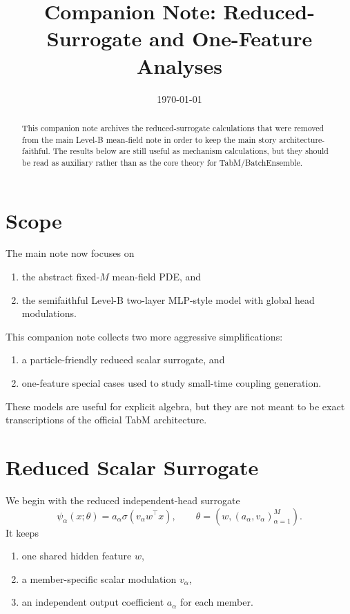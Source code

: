 \documentclass[11pt]{article}
\title{Companion Note: Reduced-Surrogate and One-Feature Analyses}
\author{}
\date{\today}
\theoremstyle{definition}
\begin{document}
\maketitle

\begin{abstract}
This companion note archives the reduced-surrogate calculations that were removed from the main Level-B mean-field note in order to keep the main story architecture-faithful.
The results below are still useful as mechanism calculations, but they should be read as auxiliary rather than as the core theory for TabM/BatchEnsemble.
\end{abstract}

\section{Scope}

The main note now focuses on
\begin{enumerate}[leftmargin=2em]
  \item the abstract fixed-$M$ mean-field PDE, and
  \item the semifaithful Level-B two-layer MLP-style model with global head modulations.
\end{enumerate}
This companion note collects two more aggressive simplifications:
\begin{enumerate}[leftmargin=2em]
  \item a particle-friendly reduced scalar surrogate, and
  \item one-feature special cases used to study small-time coupling generation.
\end{enumerate}
These models are useful for explicit algebra, but they are not meant to be exact transcriptions of the official TabM architecture.

\section{Reduced Scalar Surrogate}

We begin with the reduced independent-head surrogate
\begin{equation}
  \psi_\alpha(x;\theta)
  =
  a_\alpha \sigma(v_\alpha w^\top x),
  \qquad
  \theta=(w,(a_\alpha,v_\alpha)_{\alpha=1}^M).
  \label{eq:tabm-proxy}
\end{equation}
It keeps
\begin{enumerate}[leftmargin=2em]
  \item one shared hidden feature $w$,
  \item a member-specific scalar modulation $v_\alpha$,
  \item an independent output coefficient $a_\alpha$ for each member.
\end{enumerate}
\end{document}
